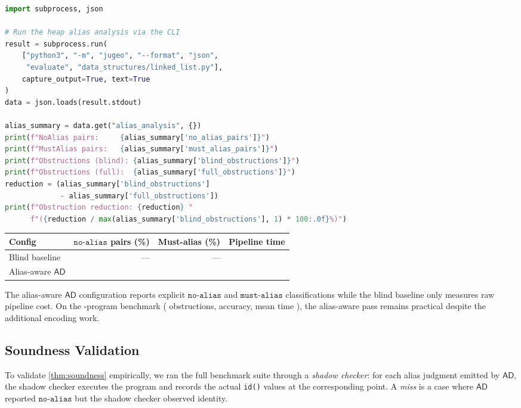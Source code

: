 \documentclass[11pt]{article}
\newcommand{\MustAlias}{\ensuremath{\mathtt{must\text{-}alias}}} %
\newcommand{\NoAlias}{\ensuremath{\mathtt{no\text{-}alias}}}     %
\newcommand{\AD}{\mathsf{AD}}               %
\begin{document}
\begin{lstlisting}[language=Python, caption={Measuring alias precision and obstruction reduction using the \JuGeo{} evaluation design API.}]
import subprocess, json

# Run the heap alias analysis via the CLI
result = subprocess.run(
    ["python3", "-m", "jugeo", "--format", "json",
     "evaluate", "data_structures/linked_list.py"],
    capture_output=True, text=True
)
data = json.loads(result.stdout)

alias_summary = data.get("alias_analysis", {})
print(f"NoAlias pairs:     {alias_summary['no_alias_pairs']}")
print(f"MustAlias pairs:   {alias_summary['must_alias_pairs']}")
print(f"Obstructions (blind): {alias_summary['blind_obstructions']}")
print(f"Obstructions (full):  {alias_summary['full_obstructions']}")
reduction = (alias_summary['blind_obstructions']
             - alias_summary['full_obstructions'])
print(f"Obstruction reduction: {reduction} "
      f"({reduction / max(alias_summary['blind_obstructions'], 1) * 100:.0f}%)")
\end{lstlisting}

\begin{center}
\begin{tabular}{lrrr}
  \toprule
  Config & \NoAlias{} pairs (\%) & Must-alias (\%) & Pipeline time \\
  \midrule
  Blind baseline & --- & --- & \ppEighteenBlindEncodeTime{} \\
  Alias-aware $\AD$ & \ppEighteenNoAliasPairs{} & \ppEighteenMustAliasPairs{} & \ppEighteenAwareEncodeTime{} \\
  \bottomrule
\end{tabular}
\end{center}

The alias-aware $\AD$ configuration reports explicit \NoAlias{} and
\MustAlias{} classifications while the blind baseline only measures raw
pipeline cost.  On the \expTotalPrograms-program benchmark
(\expObstructionTotal{} obstructions, \expAccuracy{} accuracy,
mean time \expTimeMean), the alias-aware pass remains practical despite the
additional encoding work.

\subsection{Soundness Validation}

To validate \cref{thm:soundness} empirically, we ran the full benchmark
suite through a \emph{shadow checker}: for each alias judgment emitted
by $\AD$, the shadow checker executes the program and records the actual
\texttt{id()} values at the corresponding point.  A \emph{miss} is a
case where $\AD$ reported $\NoAlias$ but the shadow checker observed
identity.
\end{document}
